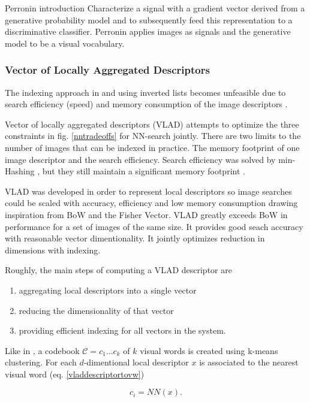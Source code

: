 \documentclass[english,12pt,a4paper,pdftex,elec,utf8]{aaltothesis}
\begin{document}
Perronin introduction
Characterize a signal with a gradient vector derived from a generative probability model and to subsequently feed this representation to a discriminative classifier. Perronin applies images as signals and the generative model to be a visual vocabulary.



\subsubsection{Vector of Locally Aggregated Descriptors}
The indexing approach in \cite{Sivic2003} and \cite{Jegou2008} using inverted lists becomes unfeasible due to search efficiency (speed) and memory consumption of the image descriptors \cite{Jegou2010}.

Vector of locally aggregated descriptors (VLAD) attempts to optimize the three constraints in fig. \ref{nntradeoffs} for NN-search jointly. There are two limits to the number of images that can be indexed in practice. The memory footprint of one image descriptor and the search efficiency. Search efficiency was solved by min-Hashing \cite{Chum2008}, \cite{Chum2009} but they still maintain a significant memory footprint \cite{Jegou2010}.

VLAD was developed in order to represent local descriptors so image searches could be scaled with accuracy, efficiency and low memory consumption drawing inspiration from BoW and the Fisher Vector. VLAD greatly exceeds BoW in performance for a set of images of the same size. It provides good seach accuracy with reasonable vector dimentionality. It jointly optimizes reduction in dimensions with indexing. \cite{Jegou2010}

Roughly, the main steps of computing a VLAD descriptor are
\begin{enumerate}
\item aggregating local descriptors into a single vector
\item reducing the dimensionality of that vector
\item providing efficient indexing for all vectors in the system.
\end{enumerate}

Like in \cite{Sivic2003}, \cite{Jegou2011} a codebook $\mathcal{C}={c_1 \ldots c_k}$ of $k$ visual words is created using k-means clustering. For each $d$-dimentional local descriptor $x$ is associated to the nearest visual word (eq. \ref{vladdescriptortovw})

\begin{equation}
  \label{vladdescriptortovw}
c_i = NN(x).
\end{equation}
\end{document}
